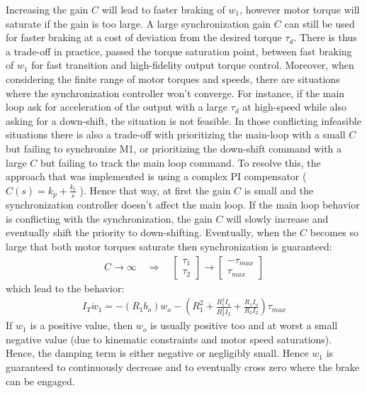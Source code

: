 Increasing the gain $C$ will lead to faster braking of $w_1$, however motor torque will saturate if the gain is too large. A large synchronization gain $C$ can still be used for faster braking at a cost of deviation from the desired torque $\tau_d$. There is thus a trade-off in practice, passed the torque saturation point, between fast braking of $w_1$ for fast transition and high-fidelity output torque control. Moreover, when considering the finite range of motor torques and speeds, there are situations where the synchronization controller won't converge. For instance, if the main loop ask for acceleration of the output with a large $\tau_d$ at high-speed while also asking for a down-shift, the situation is not feasible. In those conflicting infeasible situations there is also a trade-off with prioritizing the main-loop with a small $C$ but failing to synchronize M1, or prioritizing the down-shift command with a large $C$ but failing to track the main loop command. To resolve this, the approach that was implemented is using a complex PI compensator ( $C(s) = k_p + \frac{k_i}{s}$ ). Hence that way, at first the gain $C$ is small and the synchronization controller doesn't affect the main loop. If the main loop behavior is conflicting with the synchronization, the gain $C$ will slowly increase and eventually shift the priority to down-shifting. Eventually, when the $C$ becomes so large that both motor torques saturate then synchronization is guaranteed: %
%
\begin{align}
C \rightarrow \infty \quad\Rightarrow\quad 
\left[ \begin{array}{c}
\tau_1 \\ \tau_2
\end{array} \right] \rightarrow
\left[ \begin{array}{c}
-\tau_{max} \\ \tau_{max}
\end{array} \right]
\end{align}
%
which lead to the behavior:
%
\begin{align}
I_T \dot{w}_1 = - \left( R_1 b_o \right) w_o  - \left( R_1^2 + \frac{R_1^2 I_o }{R_2^2 I_2} + \frac{R_1 I_o}{R_2 I_2} \right) \tau_{max}
\end{align}
%
If $w_1$ is a positive value, then $w_o$ is usually positive too and at worst a small negative value (due to kinematic constraints and motor speed saturations). Hence, the damping term is either negative or negligibly small. Hence $w_1$ is guaranteed to continuously decrease and to eventually cross zero where the brake can be engaged. 

